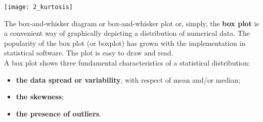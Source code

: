 \begin{frame}
  \begin{center}
    \vspace{-1.7cm}
    \texttt{[image: 2\_kurtosis]}
  \end{center}
\end{frame}



\begin{frame}
  \vspace*{.35cm}
  The box-and-whisker diagram or box-and-whisker plot or, simply, the \textbf{box plot} is a convenient way of graphically depicting a distribution of numerical data. The popularity of the box plot (or boxplot) has grown with the implementation in statistical software. The plot is easy to draw and read. \\
  \vspace*{.35cm}
  A box plot shows three fundamental characteristics of a statistical distribution:\\
  \vspace*{.35cm}
  \begin{itemize}
    \item \textbf{the data spread or variability}, with respect of mean and/or median;
    \item \textbf{the skewness};
    \item \textbf{the presence of outliers}.
  \end{itemize}
\end{frame}

